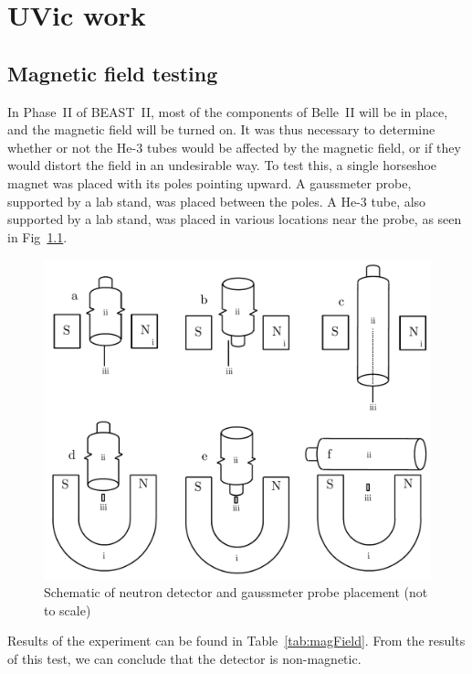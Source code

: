 \chapter{UVic work}
\label{chap:uvicwrk}

\section{Magnetic field testing}

	In Phase~II of BEAST~II, most of the components of Belle~II will be in place, and the magnetic field will be turned on. It was thus necessary to determine whether or not the He-3 tubes would be affected by the magnetic field, or if they would distort the field in an undesirable way. To test this, a single horseshoe magnet was placed with its poles pointing upward. A gaussmeter probe, supported by a lab stand, was placed between the poles. A He-3 tube, also supported by a lab stand, was placed in various locations near the probe, as seen in Fig~\ref{fig:apparatusSchematic}.

\begin{figure}[htb]
	\centering
	\includegraphics[width=5in]{images/Apparatus_III}
	\caption{Schematic of neutron detector and gaussmeter probe placement (not to scale)}	
	\label{fig:apparatusSchematic}
\end{figure}

Results of the experiment can be found in Table~\ref{tab:magField}. From the results of this test, we can conclude that the detector is non-magnetic.

